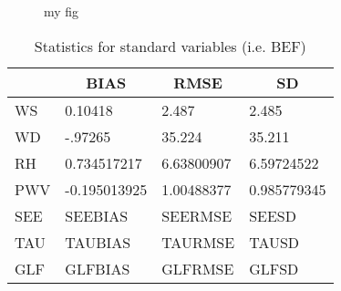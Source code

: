 \documentclass[11pt,english]{article}
\begin{document}
\clearpage
\begin{figure}
\begin{minipage}{.5\linewidth}
\centering
{}
\end{minipage}%
\begin{minipage}{.5\linewidth}
\centering
{}
\end{minipage}\par\medskip
\centering
{}
\caption{my fig}
\label{fig:main}
\end{figure}
\newpage
\begin{table}[]
\begin{center}
\begin{tabular}{|l|l|l|l|}
\hline
                            & \multicolumn{1}{c|}{\cellcolor[HTML]{C0C0C0}\textbf{BIAS}} & \multicolumn{1}{c|}{\cellcolor[HTML]{C0C0C0}\textbf{RMSE}} & \multicolumn{1}{c|}{\cellcolor[HTML]{C0C0C0}\textbf{SD}} \\\hline
\cellcolor[HTML]{C0C0C0}WS  &   0.10418                                &     2.487                                &     2.485                                \\
\cellcolor[HTML]{C0C0C0}WD  &   -.97265                                &    35.224                                &    35.211                                \\
\cellcolor[HTML]{C0C0C0}RH  &   0.734517217                                    &    6.63800907                                    &    6.59724522                                    \\
\cellcolor[HTML]{C0C0C0}PWV &  -0.195013925                                   &    1.00488377                                   &   0.985779345                                   \\
\cellcolor[HTML]{C0C0C0}SEE & SEEBIAS                               & SEERMSE                               & SEESD                               \\
\cellcolor[HTML]{C0C0C0}TAU & TAUBIAS                               & TAURMSE                               & TAUSD                               \\
\cellcolor[HTML]{C0C0C0}GLF & GLFBIAS                               & GLFRMSE                               & GLFSD                               \\
\hline
\end{tabular}
\caption{Statistics for standard variables (i.e. BEF)}
\end{center}
\end{table}
\clearpage
\end{document}
